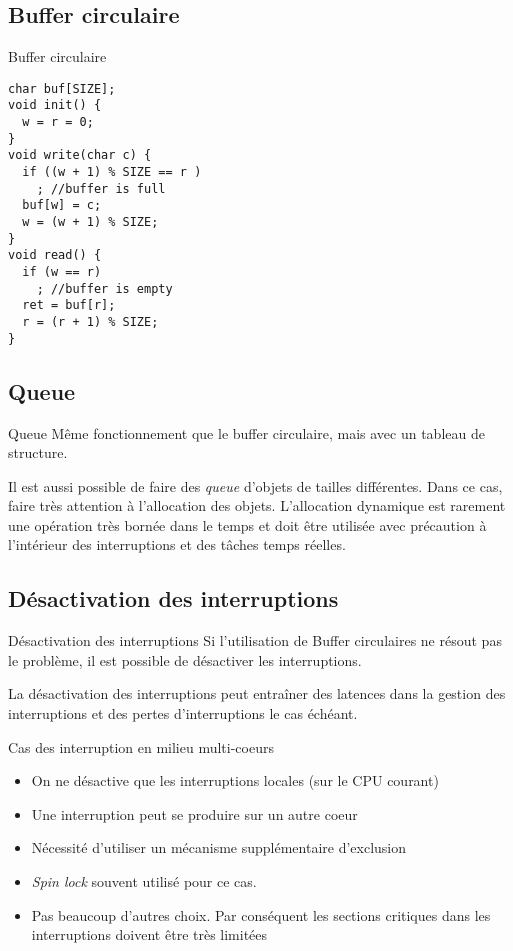 \subsection{Buffer circulaire}

\begin{frame}[fragile]{Buffer circulaire}
  \begin{lstlisting}
char buf[SIZE];
void init() {
  w = r = 0;
}
void write(char c) {
  if ((w + 1) % SIZE == r )
    ; //buffer is full
  buf[w] = c;
  w = (w + 1) % SIZE;
}
void read() {
  if (w == r)
    ; //buffer is empty
  ret = buf[r];
  r = (r + 1) % SIZE;
}
  \end{lstlisting}
\end{frame}

\subsection{Queue}

\begin{frame}{Queue}
  Même fonctionnement  que le buffer circulaire, mais  avec un tableau
  de structure.

  Il est aussi possible de  faire des \emph{queue} d'objets de tailles
  différentes.  Dans  ce cas, faire très attention  à l'allocation des
  objets.   L'allocation  dynamique est  rarement  une opération  très
  bornée  dans  le temps  et  doit  être  utilisée avec  précaution  à
  l'intérieur des interruptions et des tâches temps réelles.
\end{frame}

\subsection{Désactivation des interruptions}

\begin{frame}{Désactivation des interruptions}
  Si l'utilisation de Buffer circulaires ne résout pas le problème, il
  est possible de désactiver les interruptions.

  La désactivation des interruptions  peut entraîner des latences dans
  la gestion  des interruptions et  des pertes d'interruptions  le cas
  échéant.
\end{frame}

\begin{frame}{Cas des interruption en milieu multi-coeurs}
  \begin{itemize}
  \item  On ne  désactive que  les interruptions  locales (sur  le CPU
    courant)
  \item Une interruption peut se produire sur un autre coeur
  \item Nécessité d'utiliser un mécanisme supplémentaire d'exclusion
  \item \emph{Spin lock} souvent utilisé pour ce cas.
  \item  Pas beaucoup  d'autres  choix.  Par  conséquent les  sections
    critiques dans les interruptions doivent être très limitées
  \end{itemize}
\end{frame}

